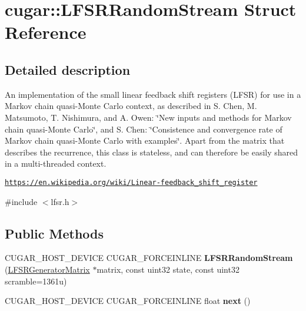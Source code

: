 \hypertarget{structcugar_1_1_l_f_s_r_random_stream}{}\section{cugar\+:\+:L\+F\+S\+R\+Random\+Stream Struct Reference}
\label{structcugar_1_1_l_f_s_r_random_stream}


\subsection{Detailed description}
An implementation of the small linear feedback shift registers (L\+F\+SR) for use in a Markov chain quasi-\/\+Monte Carlo context, as described in S. Chen, M. Matsumoto, T. Nishimura, and A. Owen\+: \char`\"{}\+New inputs and methods for Markov
chain quasi-\/\+Monte Carlo\char`\"{}, and S. Chen\+: \char`\"{}\+Consistence and convergence rate of
\+Markov chain quasi-\/\+Monte Carlo with examples\char`\"{}. Apart from the matrix that describes the recurrence, this class is stateless, and can therefore be easily shared in a multi-\/threaded context.

\href{https://en.wikipedia.org/wiki/Linear-feedback_shift_register}{\tt https\+://en.\+wikipedia.\+org/wiki/\+Linear-\/feedback\+\_\+shift\+\_\+register} 

{\ttfamily \#include $<$lfsr.\+h$>$}

\subsection*{Public Methods}
\begin{DoxyCompactItemize}
\item 
\mbox{\label{structcugar_1_1_l_f_s_r_random_stream_a941ae605b20b4e0a3663ec6c2a8226c8}} 
C\+U\+G\+A\+R\+\_\+\+H\+O\+S\+T\+\_\+\+D\+E\+V\+I\+CE C\+U\+G\+A\+R\+\_\+\+F\+O\+R\+C\+E\+I\+N\+L\+I\+NE {\bfseries L\+F\+S\+R\+Random\+Stream} (\hyperlink{classcugar_1_1_l_f_s_r_generator_matrix}{L\+F\+S\+R\+Generator\+Matrix} $\ast$matrix, const uint32 state, const uint32 scramble=1361u)
\item 
C\+U\+G\+A\+R\+\_\+\+H\+O\+S\+T\+\_\+\+D\+E\+V\+I\+CE C\+U\+G\+A\+R\+\_\+\+F\+O\+R\+C\+E\+I\+N\+L\+I\+NE float {\bfseries next} ()
\end{DoxyCompactItemize}
